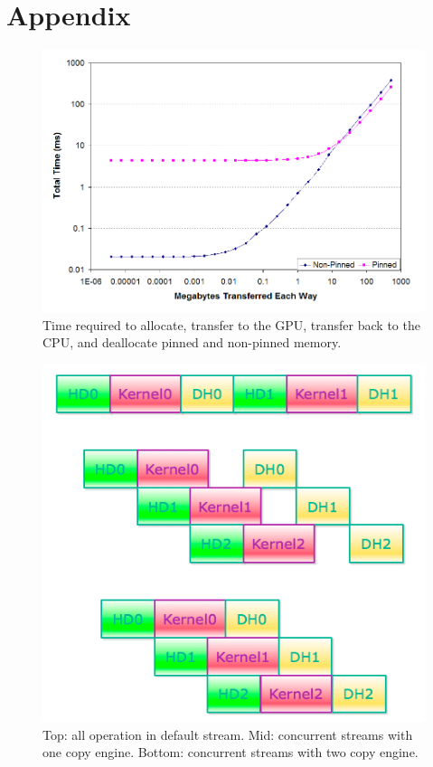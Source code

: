 \documentclass[journal,11pt,onecolumn,draftclsnofoot]{ieeeconf}  %
\begin{document}
\section{Appendix}
\begin{figure}[h]
	\centering\includegraphics[width=120mm]{pinned_trade_off.png}
	\caption{Time required to allocate, transfer to the GPU, transfer back to the CPU, and deallocate pinned and non-pinned memory.\cite{Trade_off}}
	\label{Time required to allocate, transfer to the GPU, transfer back to the CPU, and deallocate pinned and non-pinned memory.}
\end{figure}
\begin{figure}[h]
	\centering\includegraphics[width=120mm]{concurrent.png}
	\caption{Top: all operation in default stream. Mid: concurrent streams with one copy engine. Bottom: concurrent streams with two copy engine.}
	\label{concurrent}
\end{figure}
\end{document}
